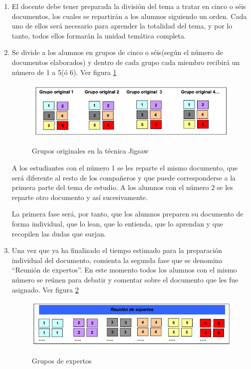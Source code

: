 \begin{enumerate}
  \item El docente debe tener preparada la división del tema a tratar en cinco o séis documentos, los cuales se repartirán a los alumnos siguiendo un orden. Cada uno de ellos será necesario para aprender la totalidad del tema, y por lo tanto, todos ellos formarán la unidad temática completa.
  \item Se divide a los alumnos en grupos de cinco o séis(según el número de documentos elaborados) y dentro de cada grupo cada miembro recibirá un número de 1 a 5(ó 6). Ver figura \ref{fig:jigsaw01}

\begin{figure}[h]
  \centering
  \includegraphics[scale=0.6]{figuras/jigsaw01.png}\\
  \caption{Grupos originales en la técnica Jigsaw}\label{fig:jigsaw01}
\end{figure}

A los estudiantes con el número 1 se les reparte el mismo documento, que será diferente al resto de los compañeros y que puede corresponderse a la primera parte del tema de estudio. A los alumnos con el número 2 se les reparte otro documento y así sucesivamente.

La primera fase será, por tanto, que los alumnos preparen su documento de forma individual, que lo lean, que lo entienda, que lo aprendan y que recopilen las dudas que surjan.

  \item Una vez que ya ha finalizado el tiempo estimado para la preparación individual del documento, comienta la segunda fase que se denomina ``Reunión de expertos''. En este momento todos los alumnos con el mismo número se reúnen para debatir y comentar sobre el documento que les fue asignado. Ver figura \ref{fig:jigsaw02}

  \begin{figure}[h]
  \centering
  \includegraphics[scale=0.6]{figuras/jigsaw02.png}\\
  \caption{Grupos de expertos}\label{fig:jigsaw02}
\end{figure}


\end{enumerate}

